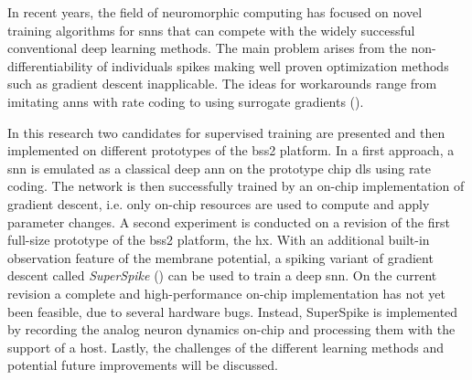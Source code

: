 In recent years, the field of neuromorphic computing has focused on novel training algorithms for \glspl{snn} that can compete with the widely successful conventional deep learning methods. The main problem arises from the non-differentiability of individuals spikes making well proven optimization methods such as gradient descent inapplicable. The ideas for workarounds range from imitating \glspl{ann} with rate coding to using surrogate gradients (\citealp{tavanaei2019deep}).

In this research two candidates for supervised training are presented and then implemented on different prototypes of the \gls{bss2} platform. In a first approach, a \gls{snn} is emulated as a classical deep \gls{ann} on the prototype chip \acrshort{dls} using rate coding. The network is then successfully trained by an on-chip implementation of gradient descent, i.e. only on-chip resources are used to compute and apply parameter changes. A second experiment is conducted on a revision of the first full-size prototype of the \gls{bss2} platform, the \acrshort{hx}. With an additional built-in observation feature of the membrane potential, a spiking variant of gradient descent called \emph{SuperSpike} (\cite{zenke2018superspike}) can be used to train a deep \gls{snn}. On the current revision a complete and high-performance on-chip implementation has not yet been feasible, due to several hardware bugs. Instead, SuperSpike is implemented by recording the analog neuron dynamics on-chip and processing them with the support of a host. Lastly, the challenges of the different learning methods and potential future improvements will be discussed.\\